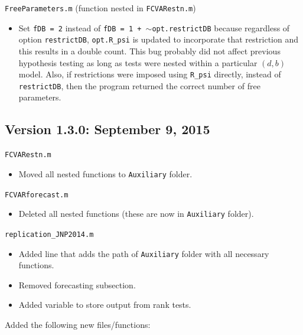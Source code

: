 \documentclass[10pt]{article}
\begin{document}
\noindent \verb|FreeParameters.m| (function nested in \verb|FCVARestn.m|)
\begin{itemize}
\item Set \verb|fDB = 2| instead of \verb|fDB = 1 + |$\sim$\verb|opt.restrictDB| because regardless of option \verb|restrictDB|, \verb|opt.R_psi| is updated to incorporate that restriction and this results in a double count. This bug probably did not affect previous hypothesis testing as long as tests were nested within a particular $(d,b)$ model. Also, if restrictions were imposed using \verb|R_psi| directly, instead of \verb|restrictDB|, then the program returned the correct number of free parameters. 
\end{itemize}

\subsection{Version 1.3.0: September 9, 2015}
\noindent \verb|FCVARestn.m|
\begin{itemize}
\item Moved all nested functions to \verb|Auxiliary| folder.
\end{itemize}

\noindent \verb|FCVARforecast.m|
\begin{itemize}
\item Deleted all nested functions (these are now in \verb|Auxiliary| folder).
\end{itemize}

\noindent \verb|replication_JNP2014.m|
\begin{itemize}
\item Added line that adds the path of \verb|Auxiliary| folder with all necessary functions.
\item Removed forecasting subsection.
\item Added variable to store output from rank tests.
\end{itemize}


\noindent Added the following new files/functions:
\end{document}
